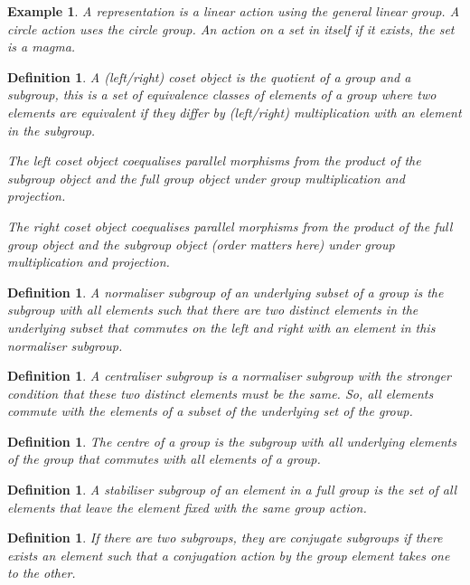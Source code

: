 \documentclass{tufte-book}
\newtheorem{definition}[theorem]{Definition}
\newtheorem{example}[theorem]{Example}
\begin{document}
\begin{example}
  A representation is a linear action using the general linear group. A circle action uses the circle group. An action on a set in itself if it exists, the set is a magma.
\end{example}

\begin{definition}
  A (left/right) coset object is the quotient of a group and a subgroup, this is a set of equivalence classes of elements of a group where two elements are equivalent if they differ by (left/right) multiplication with an element in the subgroup.

  The left coset object coequalises parallel morphisms from the product of the subgroup object and the full group object under group multiplication and projection.

  The right coset object coequalises parallel morphisms from the product of the full group object and the subgroup object (order matters here) under group multiplication and projection.
\end{definition}

\begin{definition}
  A normaliser subgroup of an underlying subset of a group is the subgroup with all elements such that there are two distinct elements in the underlying subset that commutes on the left and right with an element in this normaliser subgroup.
\end{definition}

\begin{definition}
  A centraliser subgroup is a normaliser subgroup with the stronger condition that these two distinct elements must be the same. So, all elements commute with the elements of a subset of the underlying set of the group.
\end{definition}

\begin{definition}
  The centre of a group is the subgroup with all underlying elements of the group that commutes with all elements of a group.
\end{definition}

\begin{definition}
  A stabiliser subgroup of an element in a full group is the set of all elements that leave the element fixed with the same group action. 
\end{definition}

\begin{definition}
  If there are two subgroups, they are conjugate subgroups if there exists an element such that a conjugation action by the group element takes one to the other.
\end{definition}
\end{document}

